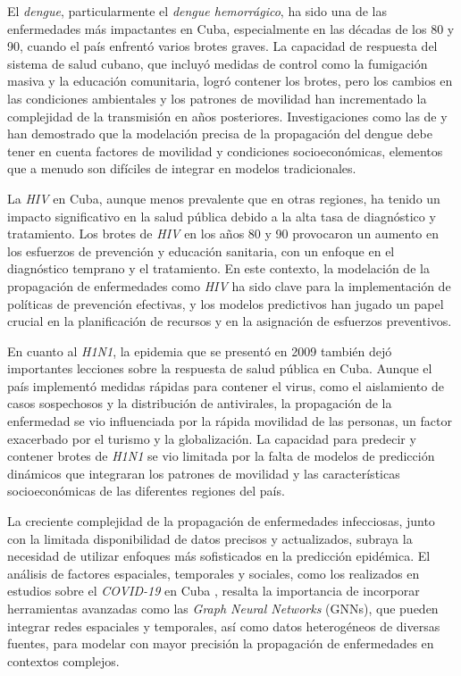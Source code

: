 El \textit{dengue}, particularmente el \textit{dengue hemorrágico}, ha sido una de las enfermedades más impactantes en Cuba, especialmente en las décadas de los 80 y 90, cuando el país enfrentó varios brotes graves. La capacidad de respuesta del sistema de salud cubano, que incluyó medidas de control como la fumigación masiva y la educación comunitaria, logró contener los brotes, pero los cambios en las condiciones ambientales y los patrones de movilidad han incrementado la complejidad de la transmisión en años posteriores. Investigaciones como las de \textcite{dengue-cuba-2010} y \textcite{hemorrhagic-dengue-2015} han demostrado que la modelación precisa de la propagación del dengue debe tener en cuenta factores de movilidad y condiciones socioeconómicas, elementos que a menudo son difíciles de integrar en modelos tradicionales.

La \textit{HIV} en Cuba, aunque menos prevalente que en otras regiones, ha tenido un impacto significativo en la salud pública debido a la alta tasa de diagnóstico y tratamiento. Los brotes de \textit{HIV} en los años 80 y 90 provocaron un aumento en los esfuerzos de prevención y educación sanitaria, con un enfoque en el diagnóstico temprano y el tratamiento. En este contexto, la modelación de la propagación de enfermedades como \textit{HIV} ha sido clave para la implementación de políticas de prevención efectivas, y los modelos predictivos han jugado un papel crucial en la planificación de recursos y en la asignación de esfuerzos preventivos.

En cuanto al \textit{H1N1}, la epidemia que se presentó en 2009 también dejó importantes lecciones sobre la respuesta de salud pública en Cuba. Aunque el país implementó medidas rápidas para contener el virus, como el aislamiento de casos sospechosos y la distribución de antivirales, la propagación de la enfermedad se vio influenciada por la rápida movilidad de las personas, un factor exacerbado por el turismo y la globalización. La capacidad para predecir y contener brotes de \textit{H1N1} se vio limitada por la falta de modelos de predicción dinámicos que integraran los patrones de movilidad y las características socioeconómicas de las diferentes regiones del país.

La creciente complejidad de la propagación de enfermedades infecciosas, junto con la limitada disponibilidad de datos precisos y actualizados, subraya la necesidad de utilizar enfoques más sofisticados en la predicción epidémica. El análisis de factores espaciales, temporales y sociales, como los realizados en estudios sobre el \textit{COVID-19} en Cuba \textcite{covid-cuba-2020}, resalta la importancia de incorporar herramientas avanzadas como las \textit{Graph Neural Networks} (GNNs), que pueden integrar redes espaciales y temporales, así como datos heterogéneos de diversas fuentes, para modelar con mayor precisión la propagación de enfermedades en contextos complejos.


